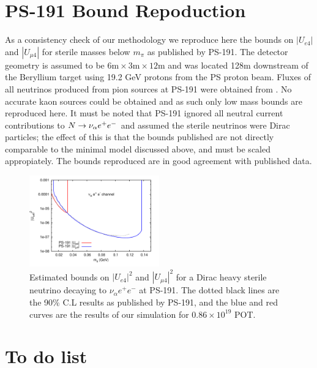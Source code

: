 \documentclass[11pt, a4paper]{article}
\def\ster{\ensuremath N}
\begin{document}
\section{PS-191 Bound Repoduction}

As a consistency check of our methodology we reproduce here the bounds on
$|U_{e4}|$ and $|U_{\mu 4}|$ for sterile masses below $m_\pi$ as published by
PS-191. The detector geometry is assumed to be $6\text{m} \times 3\text{m}
\times 12 \text{m}$ and was located 128m downstream of the Beryllium target
using 19.2 GeV protons from the PS proton beam.  Fluxes of all neutrinos
produced from pion sources at PS-191 were obtained from \cite{ps191THesis}. No
accurate kaon sources could be obtained and as such only low mass bounds are
reproduced here. It must be noted that PS-191 ignored all neutral current
contributions to $\ster \rightarrow \nu_\alpha e^+ e^-$ and assumed the sterile
neutrinos were Dirac particles; the effect of this is that the bounds published
are not directly comparable to the minimal model discussed above, and must be
scaled appropiately. The bounds reproduced are in good agreement with published
data.

\begin{figure}
			  \centering
			 
\includegraphics[width=0.5\textwidth]{figures/PS-191_test.pdf}

\caption{\label{fig:ps191test} Estimated bounds on $|U_{e4}|^2$ and $|U_{\mu
4}|^2$ for a Dirac heavy sterile neutrino decaying to $\nu_\alpha e^+ e^-$ at
PS-191. The dotted black lines are the 90\% C.L results as published by PS-191,
and the blue and red curves are the results of our simulation for $0.86 \times
10^{19}$ POT.}

\end{figure}


\newpage

\section{To do list}
\end{document}
